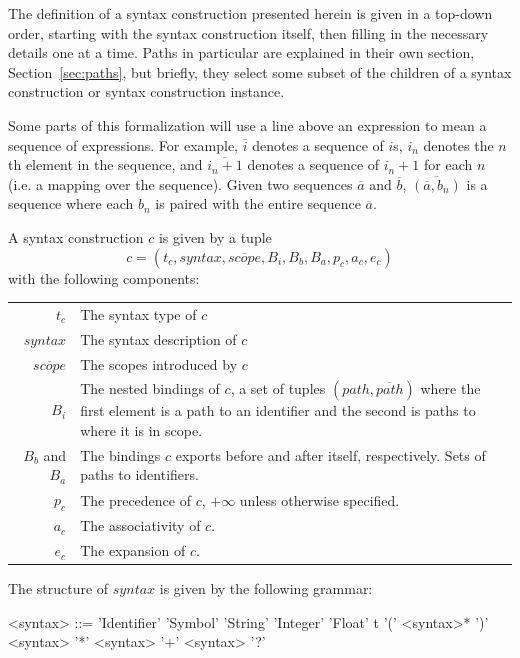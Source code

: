 \documentclass{kththesis}
\begin{document}
The definition of a syntax construction presented herein is given in a top-down order, starting with the syntax construction itself, then filling in the necessary details one at a time. Paths in particular are explained in their own section, Section~\ref{sec:paths}, but briefly, they select some subset of the children of a syntax construction or syntax construction instance.

Some parts of this formalization will use a line above an expression to mean a sequence of expressions. For example, $\overline{i}$ denotes a sequence of $i$s, $i_n$ denotes the $n$th element in the sequence, and $\overline{i_n + 1}$ denotes a sequence of $i_n + 1$ for each $n$ (i.e. a mapping over the sequence). Given two sequences $\overline{a}$ and $\overline{b}$, $\overline{(\overline{a}, b_n)}$ is a sequence where each $b_n$ is paired with the entire sequence $\overline{a}$.

A syntax construction $c$ is given by a tuple
$$ c = (t_c, syntax, \overline{scope}, B_i, B_b, B_a, p_c, a_c, e_c) $$
with the following components:

\begin{tabular}{r|p{10cm}}
$t_c$ & The syntax type of $c$ \\
$syntax$ & The syntax description of $c$ \\
$\overline{scope}$ & The scopes introduced by $c$ \\
$B_i$ & The nested bindings of $c$, a set of tuples $(path, \overline{path})$ where the first element is a path to an identifier and the second is paths to where it is in scope. \\
$B_b$ and $B_a$ & The bindings $c$ exports before and after itself, respectively. Sets of paths to identifiers. \\
$p_c$ & The precedence of $c$, $+\infty$ unless otherwise specified. \\
$a_c$ & The associativity of $c$. \\
$e_c$ & The expansion of $c$. \\
\end{tabular}

The structure of $syntax$ is given by the following grammar:

\setlength{\grammarindent}{6em}
\begin{grammar}
<syntax> ::= 'Identifier'
  \alt 'Symbol'
  \alt 'String'
  \alt 'Integer'
  \alt 'Float'
  \alt t
  \alt '(' <syntax>* ')'
  \alt <syntax> '*'
  \alt <syntax> '+'
  \alt <syntax> '?'
\end{grammar}
\end{document}
